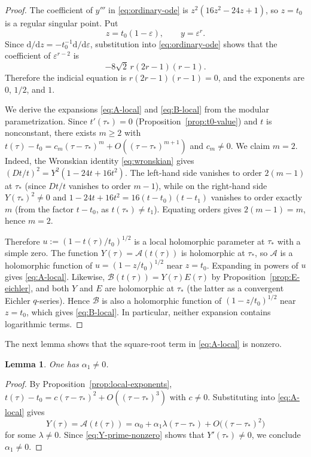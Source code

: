 \documentclass[11pt]{amsart}
\numberwithin{equation}{section}
\theoremstyle{plain}
\newtheorem{lemma}[theorem]{Lemma}
\theoremstyle{definition}
\theoremstyle{remark}
\newcommand{\dd}{\mathrm{d}}
\newcommand{\Dop}{D}
\begin{document}
\begin{proof}
The coefficient of $y'''$ in \eqref{eq:ordinary-ode} is $z^2(16z^2-24z+1)$, so $z=t_0$ is a regular singular point. Put
\[
z=t_0(1-\varepsilon),
\qquad
y=\varepsilon^r.
\]
Since $\dd/\dd z=-t_0^{-1}\dd/\dd\varepsilon$, substitution into \eqref{eq:ordinary-ode} shows that the coefficient of $\varepsilon^{r-2}$ is
\[
-8\sqrt2\,r(2r-1)(r-1).
\]
Therefore the indicial equation is $r(2r-1)(r-1)=0$, and the exponents are $0$, $1/2$, and $1$.

We derive the expansions \eqref{eq:A-local} and \eqref{eq:B-local} from the modular parametrization. Since $t'(\tau_*)=0$ (Proposition~\ref{prop:t0-value}) and $t$ is nonconstant, there exists $m\ge 2$ with $t(\tau)-t_0=c_m(\tau-\tau_*)^m+O((\tau-\tau_*)^{m+1})$ and $c_m\neq 0$. We claim $m=2$. Indeed, the Wronskian identity \eqref{eq:wronskian} gives $(\Dop t/t)^2=Y^2(1-24t+16t^2)$. The left-hand side vanishes to order $2(m-1)$ at $\tau_*$ (since $\Dop t/t$ vanishes to order $m-1$), while on the right-hand side $Y(\tau_*)^2\neq 0$ and $1-24t+16t^2=16(t-t_0)(t-t_1)$ vanishes to order exactly $m$ (from the factor $t-t_0$, as $t(\tau_*)\neq t_1$). Equating orders gives $2(m-1)=m$, hence $m=2$.

Therefore $u:=(1-t(\tau)/t_0)^{1/2}$ is a local holomorphic parameter at $\tau_*$ with a simple zero. The function $Y(\tau)=\mathcal A(t(\tau))$ is holomorphic at $\tau_*$, so $\mathcal A$ is a holomorphic function of $u=(1-z/t_0)^{1/2}$ near $z=t_0$. Expanding in powers of $u$ gives \eqref{eq:A-local}. Likewise, $\mathcal B(t(\tau))=Y(\tau)E(\tau)$ by Proposition~\ref{prop:E-eichler}, and both $Y$ and $E$ are holomorphic at $\tau_*$ (the latter as a convergent Eichler $q$-series). Hence $\mathcal B$ is also a holomorphic function of $(1-z/t_0)^{1/2}$ near $z=t_0$, which gives \eqref{eq:B-local}. In particular, neither expansion contains logarithmic terms.
\end{proof}

The next lemma shows that the square-root term in \eqref{eq:A-local} is nonzero.

\begin{lemma}\label{lem:quadratic-branch}
One has $\alpha_1\neq 0$.
\end{lemma}

\begin{proof}
By Proposition~\ref{prop:local-exponents}, $t(\tau)-t_0=c(\tau-\tau_*)^2+O((\tau-\tau_*)^3)$ with $c\neq 0$. Substituting into \eqref{eq:A-local} gives
\[
Y(\tau)=\mathcal A(t(\tau))
=\alpha_0+\alpha_1\lambda(\tau-\tau_*)+O\bigl((\tau-\tau_*)^2\bigr)
\]
for some $\lambda\neq 0$. Since \eqref{eq:Y-prime-nonzero} shows that $Y'(\tau_*)\neq 0$, we conclude $\alpha_1\neq 0$.
\end{proof}
\end{document}

